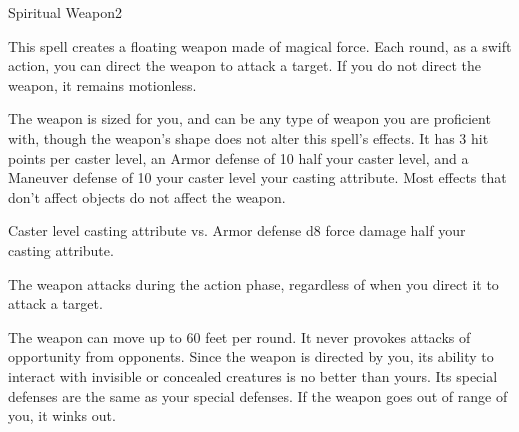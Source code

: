 \begin{spellsection}{Spiritual Weapon}{2}
\begin{spellheader}
    \begin{spelltargetinginfo}
    \end{spelltargetinginfo}
\end{spellheader}
\begin{spellcontent}
    \begin{spelleffects}
        \spelleffect This spell creates a floating weapon made of magical force. Each round, as a swift action, you can direct the weapon to attack a target. If you do not direct the weapon, it remains motionless.

        The weapon is sized for you, and can be any type of weapon you are proficient with, though the weapon's shape does not alter this spell's effects. It has 3 hit points per caster level, an Armor defense of 10 \add half your caster level, and a Maneuver defense of 10 \add your caster level \add your casting attribute. Most effects that don't affect objects do not affect the weapon.

        \begin{spellattack}{Caster level \add casting attribute vs. Armor defense}
            \spellsuccess d8 force damage \add half your casting attribute.
        \end{spellattack}
        \spelldur \durshort \dismissable
    \end{spelleffects}
\end{spellcontent}
\begin{spellfooter}
    \spellnotes The weapon attacks during the action phase, regardless of when you direct it to attack a target.

    The weapon can move up to 60 feet per round. It never provokes attacks of opportunity from opponents. Since the weapon is directed by you, its ability to interact with invisible or concealed creatures is no better than yours. Its special defenses are the same as your special defenses. If the weapon goes out of range of you, it winks out.
\end{spellfooter}
\end{spellsection}

